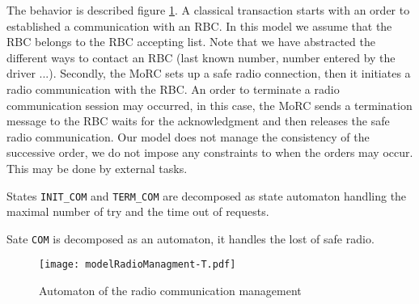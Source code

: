 The behavior is described figure \ref{fig:behavior}.
A classical transaction starts with an order to established a communication with
an RBC. In this model we assume that the RBC belongs to the RBC accepting list.
Note that we have abstracted the different ways to contact an RBC (last known
number, number entered by the driver ...). Secondly, the MoRC sets up a safe radio
connection, then it initiates a radio communication with the RBC.
An order to terminate a radio communication session may occurred, in this case,
the MoRC sends a termination message to the RBC waits for the acknowledgment and
then releases the safe radio communication.
Our model does not manage the consistency of the successive order, we do not
impose any constraints to when the orders may occur. This may be done by external
tasks.

States \verb+INIT_COM+ and \verb+TERM_COM+ are decomposed as state automaton
handling the maximal number of try and the time out of requests.

Sate \verb+COM+ is decomposed as an automaton, it handles the lost of safe
radio.
\begin{figure}[htpb]
\centering
\texttt{[image: modelRadioManagment-T.pdf]}
\caption{\label{fig:behavior}Automaton of the radio communication management}
\end{figure}

